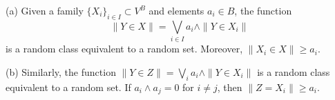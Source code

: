 (a) Given a family $\{X_i\}_{i \in I} \subset V^B$ and elements $a_i \in B$, the function
$$\|Y \in X\| = \bigvee_{i \in I} a_i \wedge \|Y \in X_i\|$$
is a random class equivalent to a random set. Moreover, $\|X_i \in X\| \geqslant a_i$.

(b) Similarly, the function $\|Y \in Z\| = \bigvee_i a_i \wedge \|Y \in X_i\|$ is a random class equivalent to a random set. If $a_i \wedge a_j = 0$ for $i \neq j$, then $\|Z = X_i\| \geqslant a_i$.